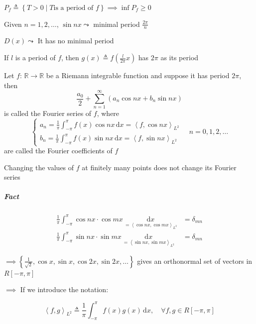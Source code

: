 $P_f\triangleq\left\{T>0\middle|T\text{is a period of }f\right\}\implies\inf P_f\geq 0$

\begin{example}
    Given $n=1,2,\dots$, $\sin nx\leadsto$ minimal period $\frac{2\pi}{n}$
\end{example}

\begin{example}
    $D(x)\leadsto$ It has no minimal period
\end{example}

If $l$ is a period of $f$, then $g(x)\triangleq f\left(\frac{l}{2\pi}x\right)$ has $2\pi$ as its period

\begin{definition}
    Let $f:\,\mathbb{R}\to\mathbb{R}$ be a Riemann integrable function and suppose it has period $2\pi$, then
    $$\frac{a_0}{2}+\sum_{n=1}^{\infty}\left(a_n\cos nx+b_n\sin nx\right)$$
    is called the Fourier series of $f$, where
    $$\begin{cases}
            a_n=\frac{1}{\pi}\int_{-\pi}^{\pi}f(x)\cos nx\,\mathrm{d}x=\left<f,\cos nx\right>_{L^2} \\
            b_n=\frac{1}{\pi}\int_{-\pi}^{\pi}f(x)\sin nx\,\mathrm{d}x=\left<f,\sin nx\right>_{L^2}
        \end{cases}\quad n=0,1,2,\dots$$
    are called the Fourier coefficients of $f$
\end{definition}

\begin{remark}
    Changing the values of $f$ at finitely many points does not change its Fourier series
\end{remark}

\subparagraph*{Fact}

\begin{align*}
    \frac{1}{\pi}\int_{-\pi}^{\pi}\cos nx\cdot\cos mx\,\underset{=\left<\cos nx,\cos mx\right>_{L^2}}{\mathrm{d}x} & =\delta_{mn} \\
    \frac{1}{\pi}\int_{-\pi}^{\pi}\sin nx\cdot\sin mx\,\underset{=\left<\sin nx,\sin mx\right>_{L^2}}{\mathrm{d}x} & =\delta_{mn}
\end{align*}

$\implies\left\{\frac{1}{\sqrt{2}},\cos x,\sin x,\cos 2x,\sin 2x,\dots\right\}$ gives an orthonormal set of vectors in $R[-\pi,\pi]$

$\implies$ If we introduce the notation:

$$\left<f,g\right>_{L^2}\triangleq\frac{1}{\pi}\int_{-\pi}^{\pi}f(x)g(x)\,\mathrm{d}x,\quad\forall f,g\in R[-\pi,\pi]$$

